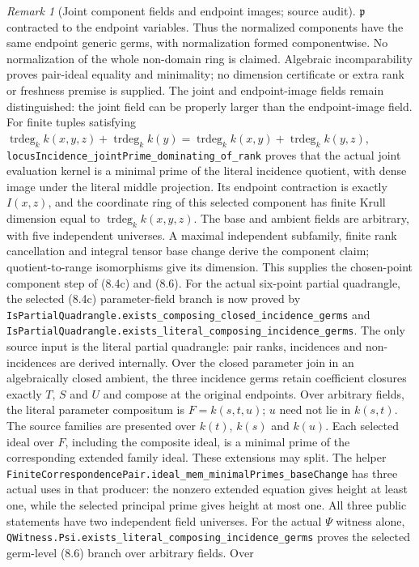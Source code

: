 \documentclass[11pt,oneside]{article}
\theoremstyle{definition}
\theoremstyle{remark}
\newtheorem{remark}[theorem]{Remark}
\newcommand{\trdeg}{\operatorname{trdeg}}
\newcommand{\lean}[1]{\nolinkurl{#1}}
\begin{document}
\begin{remark}[Joint component fields and endpoint images; source audit]
$\mathfrak p$ contracted to the endpoint variables. Thus the normalized
components have the same endpoint generic germs, with normalization
formed componentwise. No normalization of the whole non-domain ring is
claimed. Algebraic incomparability proves pair-ideal equality and minimality;
no dimension certificate or extra rank or freshness premise is supplied.
The joint and endpoint-image fields remain distinguished: the joint field
can be properly larger than the endpoint-image field.
For finite tuples satisfying
$\trdeg_k k(x,y,z)+\trdeg_k k(y)=\trdeg_k k(x,y)+\trdeg_k k(y,z)$,
\lean{locusIncidence_jointPrime_dominating_of_rank} proves that the
actual joint evaluation kernel is a minimal prime of the literal incidence
quotient, with dense image under the literal middle projection. Its
endpoint contraction is exactly $I(x,z)$, and the coordinate ring of this
selected component has finite Krull dimension equal to
$\trdeg_k k(x,y,z)$. The base and ambient fields are arbitrary, with
five independent universes. A maximal independent subfamily, finite rank
cancellation and integral tensor base change derive the component claim;
quotient-to-range isomorphisms give its dimension.
This supplies the chosen-point component step of (8.4c) and (8.6).
For the actual six-point partial quadrangle, the selected (8.4c)
parameter-field branch is now proved by
\lean{IsPartialQuadrangle.exists_composing_closed_incidence_germs} and
\lean{IsPartialQuadrangle.exists_literal_composing_incidence_germs}.
The only source input is the literal partial quadrangle: pair ranks,
incidences and non-incidences are derived internally. Over the closed
parameter join in an algebraically closed ambient, the three incidence
germs retain coefficient closures exactly $T$, $S$ and $U$ and compose
at the original endpoints. Over arbitrary fields, the literal parameter
compositum is $F=k(s,t,u)$; $u$ need not lie in $k(s,t)$. The source
families are presented over $k(t)$, $k(s)$ and $k(u)$. Each selected ideal
over $F$, including the composite ideal, is a minimal prime of the
corresponding extended family ideal. These extensions may split.
The helper \lean{FiniteCorrespondencePair.ideal_mem_minimalPrimes_baseChange}
has three actual uses in that producer: the nonzero extended equation gives height at
least one, while the selected principal prime gives height at most one.
All three public statements have two independent field universes.
For the actual $\Psi$ witness alone,
\lean{QWitness.Psi.exists_literal_composing_incidence_germs} proves the
selected germ-level (8.6) branch over arbitrary fields. Over

\end{remark}
\end{document}
